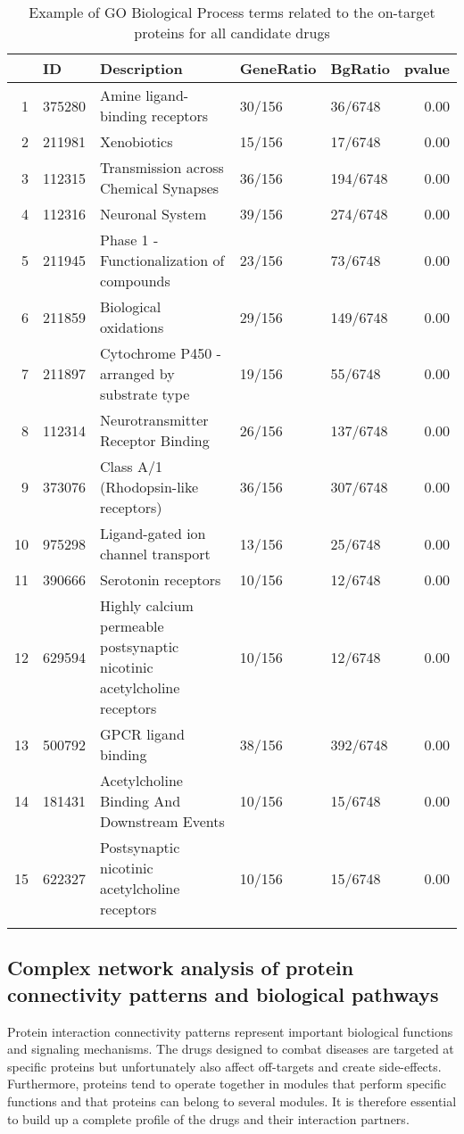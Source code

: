 \documentclass[preprint,12pt]{elsarticle}
\begin{document}
\begin{table}[h]
\centering \scriptsize \caption{Example of GO Biological Process terms related to the on-target proteins for all candidate drugs}\label{goterms}
\begin{tabular}{rllllr}
  \hline 
 & ID & Description & GeneRatio & BgRatio & pvalue  \\ 
  \hline
1 & 375280 & Amine ligand-binding receptors & 30/156 & 36/6748 & 0.00 \\ 
  2 & 211981 & Xenobiotics & 15/156 & 17/6748 & 0.00 \\ 
  3 & 112315 & Transmission across Chemical Synapses & 36/156 & 194/6748 & 0.00  \\ 
  4 & 112316 & Neuronal System & 39/156 & 274/6748 & 0.00 \\ 
  5 & 211945 & Phase 1 - Functionalization of compounds & 23/156 & 73/6748 & 0.00 \\ 
  6 & 211859 & Biological oxidations & 29/156 & 149/6748 & 0.00 \\ 
  7 & 211897 & Cytochrome P450 - arranged by substrate type & 19/156 & 55/6748 & 0.00  \\ 
  8 & 112314 & Neurotransmitter Receptor Binding  & 26/156 & 137/6748 & 0.00 \\ 
  9 & 373076 & Class A/1 (Rhodopsin-like receptors) & 36/156 & 307/6748 & 0.00 \\ 
  10 & 975298 & Ligand-gated ion channel transport & 13/156 & 25/6748 & 0.00 \\ 
  11 & 390666 & Serotonin receptors & 10/156 & 12/6748 & 0.00 \\ 
  12 & 629594 & Highly calcium permeable postsynaptic nicotinic acetylcholine receptors & 10/156 & 12/6748 & 0.00 \\ 
  13 & 500792 & GPCR ligand binding & 38/156 & 392/6748 & 0.00 \\ 
  14 & 181431 & Acetylcholine Binding And Downstream Events & 10/156 & 15/6748 & 0.00 \\ 
  15 & 622327 & Postsynaptic nicotinic acetylcholine receptors & 10/156 & 15/6748 & 0.00 \\ 
   \hline \normalsize
\end{tabular}
\end{table}

\subsection{Complex network analysis of protein connectivity patterns and biological pathways}
Protein interaction connectivity patterns represent important biological functions and signaling mechanisms.  The drugs designed to combat diseases are targeted at specific proteins but unfortunately also affect off-targets and create side-effects. Furthermore, proteins tend to operate together in modules that perform specific functions and that proteins can belong to several modules. It is therefore essential to build up a complete profile of the drugs and their interaction partners. 
\end{document}
